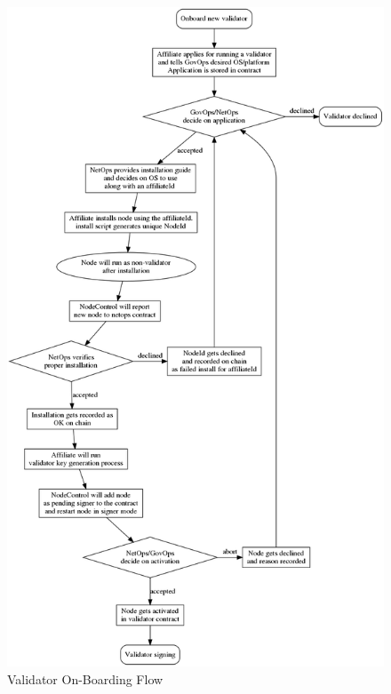 \begin{figure}[ht]
	\centering
    \includegraphics[width=\textwidth,height=\textheight,keepaspectratio]{./images/flow-onboard-validator.png}
	\caption{Validator On-Boarding Flow}
	\label{fig:onboardflow}
\end{figure}
